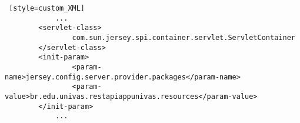 \begin{lstlisting} [style=custom_XML]
			...
		<servlet-class>
				com.sun.jersey.spi.container.servlet.ServletContainer
		</servlet-class>
		<init-param>
				<param-name>jersey.config.server.provider.packages</param-name>
				<param-value>br.edu.univas.restapiappunivas.resources</param-value>
		</init-param>
			...
\end{lstlisting}